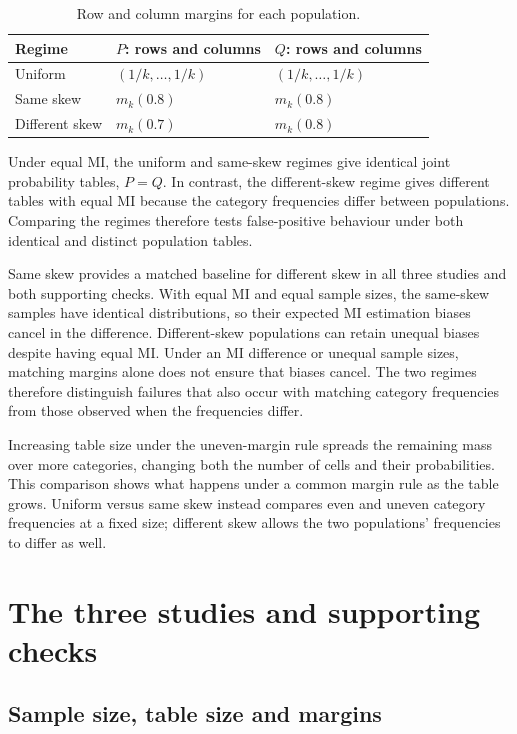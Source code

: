 \begin{table}[htbp]
\centering
\caption{Row and column margins for each population.}
\label{tab:margin-profiles}
\begin{tabular}{@{}lll@{}}
\toprule
Regime & \(P\): rows and columns & \(Q\): rows and columns\\
\midrule
Uniform & \((1/k,\ldots,1/k)\) & \((1/k,\ldots,1/k)\)\\
Same skew & \(m_k(0.8)\) & \(m_k(0.8)\)\\
Different skew & \(m_k(0.7)\) & \(m_k(0.8)\)\\
\bottomrule
\end{tabular}
\end{table}

Under equal MI, the uniform and same-skew regimes give identical joint
probability tables, \(P=Q\). In contrast, the different-skew regime gives
different tables with equal MI because the category frequencies differ
between populations. Comparing the regimes therefore tests false-positive
behaviour under both identical and distinct population tables.

Same skew provides a matched baseline for different skew in all three
studies and both supporting checks. With equal MI and equal sample sizes,
the same-skew samples have identical distributions, so their expected MI
estimation biases cancel in the difference. Different-skew populations can
retain unequal biases despite having equal MI. Under an MI difference or
unequal sample sizes, matching margins alone does not ensure that biases
cancel. The two regimes therefore distinguish failures that also occur
with matching category frequencies from those observed when the frequencies
differ.

Increasing table size under the uneven-margin rule spreads the remaining
mass over more categories, changing both the number of cells and their
probabilities. This comparison shows what happens under a common margin
rule as the table grows. Uniform versus same skew instead compares even
and uneven category frequencies at a fixed size; different skew allows the
two populations' frequencies to differ as well.

\section{The three studies and supporting checks}

\subsection{Sample size, table size and margins}

